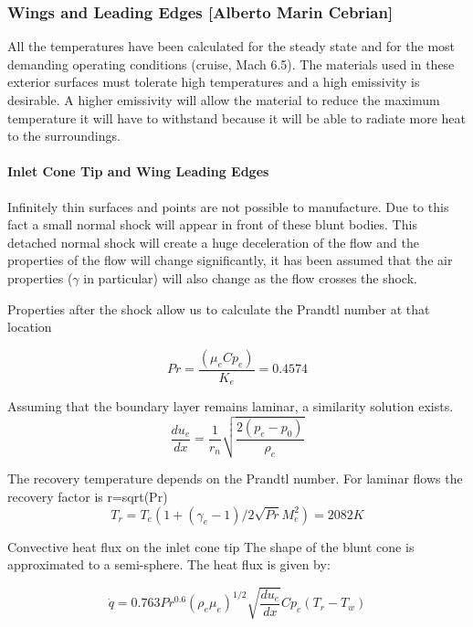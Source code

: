 \subsubsection{Wings and Leading Edges [Alberto Marin Cebrian]}
All the temperatures have been calculated for the steady state and for the most demanding operating conditions (cruise, Mach 6.5). The materials used in these exterior surfaces must tolerate high temperatures and a high emissivity is desirable. A higher emissivity will allow the material to reduce the maximum temperature it will have to withstand because it will be able to radiate more heat to the surroundings.

\paragraph{Inlet Cone Tip and Wing Leading Edges}
Infinitely thin surfaces and points are not possible to manufacture. Due to this fact a small normal shock will appear in front of these blunt bodies. This detached normal shock will create a huge deceleration of the flow and the properties of the flow will change significantly, it has been assumed that the air properties ($\gamma$ in particular) will also change as the flow crosses the shock.

Properties after the shock allow us to calculate the Prandtl number at that location

\begin{equation}
Pr=\frac{(\mu_e Cp_e)}{K_e} =0.4574
\end{equation}

Assuming that the boundary layer remains laminar, a similarity solution exists.
\begin{equation}
\frac{du_e}{dx}=\frac{1}{r_n}\sqrt{\frac{2(p_e-p_0)}{\rho_e}}
\end{equation}

The recovery temperature depends on the Prandtl number. For laminar flows the recovery factor is r=sqrt(Pr)
\begin{equation}
T_r=T_e (1+(\gamma_e-1)/2 \sqrt{Pr} M_e^2 )=2082 K
\end{equation}

Convective heat flux on the inlet cone tip
The shape of the blunt cone is approximated to a semi-sphere. The heat flux is given by:

\begin{equation}
\dot{q}=0.763Pr^{0.6}(\rho_e\mu_e)^{1/2}\sqrt{\frac{du_e}{dx}}Cp_e(T_r-T_w)
\label{eqn:tipHeatFlux}
\end{equation}

